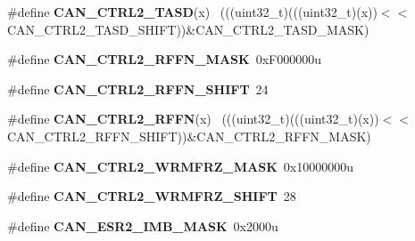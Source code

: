 \begin{DoxyCompactItemize}
\item 
\hypertarget{group___c_a_n___register___masks_ga6fa49bff7c2059e6da16b4442e09814e}{}\#define {\bfseries C\+A\+N\+\_\+\+C\+T\+R\+L2\+\_\+\+T\+A\+S\+D}(x)                                            ~(((uint32\+\_\+t)(((uint32\+\_\+t)(x))$<$$<$C\+A\+N\+\_\+\+C\+T\+R\+L2\+\_\+\+T\+A\+S\+D\+\_\+\+S\+H\+I\+F\+T))\&C\+A\+N\+\_\+\+C\+T\+R\+L2\+\_\+\+T\+A\+S\+D\+\_\+\+M\+A\+S\+K)\label{group___c_a_n___register___masks_ga6fa49bff7c2059e6da16b4442e09814e}

\item 
\hypertarget{group___c_a_n___register___masks_ga2cf8e472f27dccf6b1e9b9af80f76542}{}\#define {\bfseries C\+A\+N\+\_\+\+C\+T\+R\+L2\+\_\+\+R\+F\+F\+N\+\_\+\+M\+A\+S\+K}~0x\+F000000u\label{group___c_a_n___register___masks_ga2cf8e472f27dccf6b1e9b9af80f76542}

\item 
\hypertarget{group___c_a_n___register___masks_ga573803e007b6904ec3b8c5ab45acf33e}{}\#define {\bfseries C\+A\+N\+\_\+\+C\+T\+R\+L2\+\_\+\+R\+F\+F\+N\+\_\+\+S\+H\+I\+F\+T}~24\label{group___c_a_n___register___masks_ga573803e007b6904ec3b8c5ab45acf33e}

\item 
\hypertarget{group___c_a_n___register___masks_ga51f2e92ec3d4aed43f48ede13f13457b}{}\#define {\bfseries C\+A\+N\+\_\+\+C\+T\+R\+L2\+\_\+\+R\+F\+F\+N}(x)                                            ~(((uint32\+\_\+t)(((uint32\+\_\+t)(x))$<$$<$C\+A\+N\+\_\+\+C\+T\+R\+L2\+\_\+\+R\+F\+F\+N\+\_\+\+S\+H\+I\+F\+T))\&C\+A\+N\+\_\+\+C\+T\+R\+L2\+\_\+\+R\+F\+F\+N\+\_\+\+M\+A\+S\+K)\label{group___c_a_n___register___masks_ga51f2e92ec3d4aed43f48ede13f13457b}

\item 
\hypertarget{group___c_a_n___register___masks_ga5f73e5da9fb12e711d2b23b7092788f2}{}\#define {\bfseries C\+A\+N\+\_\+\+C\+T\+R\+L2\+\_\+\+W\+R\+M\+F\+R\+Z\+\_\+\+M\+A\+S\+K}~0x10000000u\label{group___c_a_n___register___masks_ga5f73e5da9fb12e711d2b23b7092788f2}

\item 
\hypertarget{group___c_a_n___register___masks_ga1ada3c4c31b40ac2d1d0aa69b8beead7}{}\#define {\bfseries C\+A\+N\+\_\+\+C\+T\+R\+L2\+\_\+\+W\+R\+M\+F\+R\+Z\+\_\+\+S\+H\+I\+F\+T}~28\label{group___c_a_n___register___masks_ga1ada3c4c31b40ac2d1d0aa69b8beead7}

\item 
\hypertarget{group___c_a_n___register___masks_ga8e8d269c3e59c20582dd8d0c5ea07daf}{}\#define {\bfseries C\+A\+N\+\_\+\+E\+S\+R2\+\_\+\+I\+M\+B\+\_\+\+M\+A\+S\+K}~0x2000u\label{group___c_a_n___register___masks_ga8e8d269c3e59c20582dd8d0c5ea07daf}


\end{DoxyCompactItemize}
